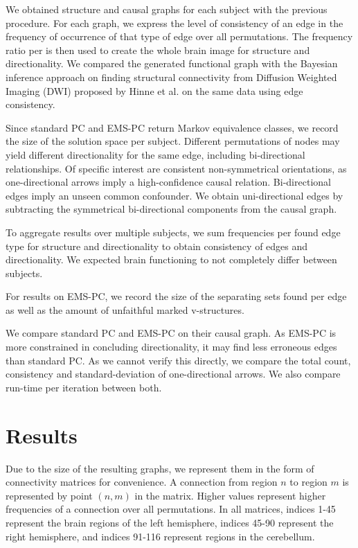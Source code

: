 \documentclass[a4paper, 10pt, english, onecolumn]{article}
\begin{document}
We obtained structure and causal graphs for each subject with the previous procedure.
For each graph, we express the level of consistency of an edge in the frequency of occurrence of that type of edge over all permutations.
The frequency ratio per is then used to create the whole brain image for structure and directionality.
We compared the generated functional graph with the Bayesian inference approach on finding structural connectivity from Diffusion Weighted Imaging (DWI) proposed by Hinne et al.\cite{hinne2013} on the same data using edge consistency.

Since standard PC and EMS-PC return Markov equivalence classes, we record the size of the solution space per subject.
Different permutations of nodes may yield different directionality for the same edge, including bi-directional relationships.
Of specific interest are consistent non-symmetrical orientations, as one-directional arrows imply a high-confidence causal relation.
Bi-directional edges imply an unseen common confounder.
We obtain uni-directional edges by subtracting the symmetrical bi-directional components from the causal graph.

To aggregate results over multiple subjects, we sum frequencies per found edge type for structure and directionality to obtain consistency of edges and directionality.
We expected brain functioning to not completely differ between subjects.

For results on EMS-PC, we record the size of the separating sets found per edge as well as the amount of unfaithful marked v-structures.

We compare standard PC and EMS-PC on their causal graph.
As EMS-PC is more constrained in concluding directionality, it may find less erroneous edges than standard PC.
As we cannot verify this directly, we compare the total count, consistency and standard-deviation of one-directional arrows.
We also compare run-time per iteration between both.

\section{Results}\label{sec:results}
Due to the size of the resulting graphs, we represent them in the form of connectivity matrices for convenience.
A connection from region $n$ to region $m$ is represented by point $(n,m)$ in the matrix.
Higher values represent higher frequencies of a connection over all permutations.
In all matrices, indices 1-45 represent the brain regions of the left hemisphere, indices 45-90 represent the right hemisphere, and indices 91-116 represent regions in the cerebellum.
\end{document}
